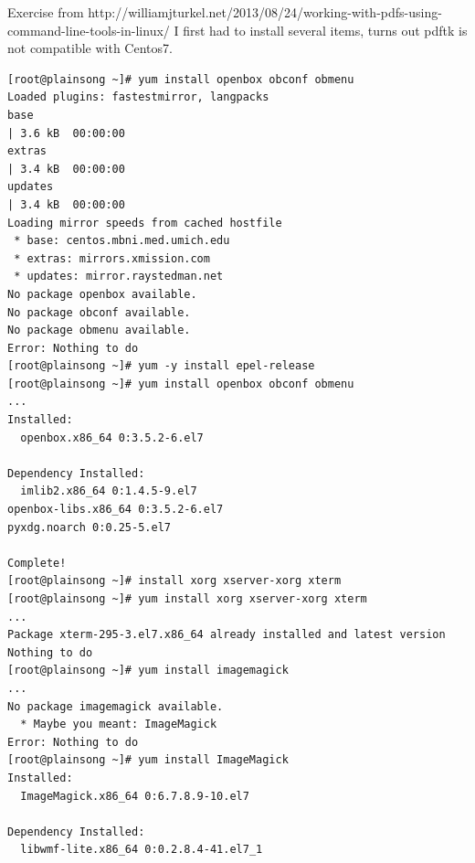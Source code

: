 \documentclass[10pt]{article}
\begin{document}
Exercise from http://williamjturkel.net/2013/08/24/working-with-pdfs-using-command-line-tools-in-linux/
I first had to install several items, turns out pdftk is not compatible with Centos7.
\begin{Verbatim}[fontsize=\scriptsize]
[root@plainsong ~]# yum install openbox obconf obmenu
Loaded plugins: fastestmirror, langpacks
base                                                                                                                                                                                 | 3.6 kB  00:00:00     
extras                                                                                                                                                                               | 3.4 kB  00:00:00     
updates                                                                                                                                                                              | 3.4 kB  00:00:00     
Loading mirror speeds from cached hostfile
 * base: centos.mbni.med.umich.edu
 * extras: mirrors.xmission.com
 * updates: mirror.raystedman.net
No package openbox available.
No package obconf available.
No package obmenu available.
Error: Nothing to do
[root@plainsong ~]# yum -y install epel-release
[root@plainsong ~]# yum install openbox obconf obmenu
...
Installed:
  openbox.x86_64 0:3.5.2-6.el7                                                                                                                                                                              

Dependency Installed:
  imlib2.x86_64 0:1.4.5-9.el7                                       openbox-libs.x86_64 0:3.5.2-6.el7                                       pyxdg.noarch 0:0.25-5.el7                                      

Complete!
[root@plainsong ~]# install xorg xserver-xorg xterm
[root@plainsong ~]# yum install xorg xserver-xorg xterm
...
Package xterm-295-3.el7.x86_64 already installed and latest version
Nothing to do
[root@plainsong ~]# yum install imagemagick
...
No package imagemagick available.
  * Maybe you meant: ImageMagick
Error: Nothing to do
[root@plainsong ~]# yum install ImageMagick
Installed:
  ImageMagick.x86_64 0:6.7.8.9-10.el7                                                                                                                                                                       

Dependency Installed:
  libwmf-lite.x86_64 0:0.2.8.4-41.el7_1                                                                                                                                                                     


\end{Verbatim}
\end{document}

